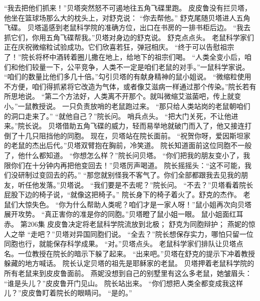 \documentclass[a4paper,12pt,UTF8,twoside]{ctexbook}
\begin{document}
        “我去把他们抓来！”贝塔突然怒不可遏地往五角飞碟里跑。  
        皮皮鲁没有拦贝塔，他坐在篮球场那么大的枕头上，对舒克说：  
        “你去帮他。”  
        舒克尾随贝塔进人五角飞碟。  
        贝塔遥感到老鼠科学院的准确方位，出口在书房的一排书柜后边。  
        “我去抓它们，你用五角飞碟帮我。”贝塔对身边的舒克说。  
        舒克点点头。  
        老鼠科学家们正在庆祝微缩粒试验成功。它们欣喜若狂，弹冠相庆。  
        “终于可以告慰祖宗了！”院长将杯中酒转着圈儿撒在地上，给地下的祖宗们喝。  
        “人类全变小后，咱们和他们较量一下，公平竞争，人类不一定是咱们老鼠的对手。”一鼠科学家说。  
        “咱们的数量比他们多几十倍。”勾引贝塔的有献身精神的鼠小姐说。  
        “微缩粒使用不方便，咱们得抓紧将它改造为气体，或者像艾滋病一样通过那个传染。”院长若有所思地说。  
        “第二个方法好，人类离不开那个。就叫微缩艾滋菌吧，传上就变小。”一鼠教授说。  
        一只负责放哨的老鼠跑过来。  
        “那只给人类站岗的老鼠朝咱们的洞口走来了。”  
        “就他自己？”院长问。  
        哨兵点头。  
        “把大门关死，不让他进来。”院长说。  
        贝塔借助五角飞碟的威力，轻而易举地就破门而入了，他又接连打倒了十几只阻挡他的同胞。  
        现在，贝塔站在院长面前。        
        “祝贺你呀，爱因斯坦家的老鼠的杰出后代。”贝塔双臂抱在胸前，冷笑道。  
        院长知道面前这位同胞不一般了，他什么都知道。  
        “你想怎么样？”院长问贝塔。  
        “你们把我的朋友变小了，我限你们在十分钟内再把他变回去！”贝塔厉声喝道。  
        院长摇摇头：“这不可能，我们没研制过变回去的药。”  
        “那您就别怪我不客气了。你们全部都跟我去见我的朋友，听任他发落。”贝塔说。  
        “我们要是不去呢？”院长问。  
        “不去？”贝塔看着院长屁股下边的椅子说，“就像这把椅子。”  
        院长身下的椅子着火了。舒克的杰作。  
        老鼠们大惊失色。  
        “你为什么帮助人类呢？咱们才是一家人呀！”鼠小姐再次向贝塔展开攻势。  
        “真正害你的准是你的同胞。”贝塔瞪了鼠小姐一眼。  
        鼠小姐面红耳赤。          第206集  
        皮皮鲁决定将老鼠科学院流放到北极；  
        舒克为同胞辩护；  
        燕妮的惊人之举    
        “走吧？”贝塔对异国同胞们说。  
        “全去？”院长想保存实力，哪怕只留一位同胞也行，就能保存科学成果。  
        “对。”贝塔点头。  
        老鼠科学家们排队让贝塔点名。一位教授在院长的暗示下躲了起来。  
        “出来吧。”贝塔在舒克的提示下冲着教授躲藏的地方喊话。  
        院长认定贝塔的祖先是耶稣家的老鼠。  
        贝塔押着老鼠科学院的所有老鼠来到皮皮鲁面前。  
        燕妮没想到自己的别墅里有这么多老鼠，她皱眉头：  
        “谁是头儿？”皮皮鲁开门见山。  
        院长站出来。  
        “你们想把人类全都变成我这样儿？”皮皮鲁盯着院长的眼睛问。  
        “是的。”  
\end{document}
